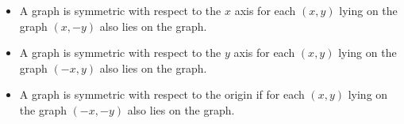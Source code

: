 \begin{frame}
\begin{itemize}
\item A graph is symmetric with respect to the $x$ axis for each $(x,y)$ lying on the graph $(x,-y)$ also lies on the graph.
\item A graph is symmetric with respect to the $y$ axis for each $(x,y)$ lying on the graph $(-x,y)$ also lies on the graph.
\item A graph is symmetric with respect to the origin if for each $(x,y)$ lying on the graph $(-x,-y)$ also lies on the graph.


\end{itemize}
\end{frame}